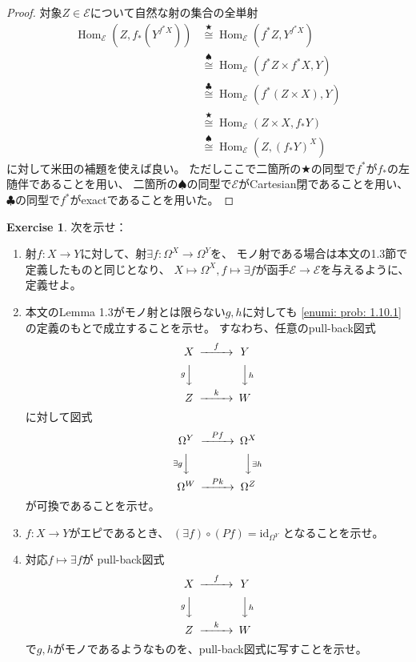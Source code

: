 \documentclass[uplatex]{jsarticle}
\theoremstyle{definition}
\newtheorem{prob}[prob]{Exercise}
\def\id{\mathrm{id}}
\DeclareMathOperator{\Hom}{Hom}
\def\mcE{\mathcal{E}}
\begin{document}
\begin{proof}
  対象\(Z\in \mcE\)について自然な射の集合の全単射
  \begin{align*}
    \Hom_{\mcE}(Z,f_*(Y^{f^*X}))
    &\overset{\bigstar}{\cong}
    \Hom_{\mcE}(f^*Z,Y^{f^*X}) \\
    &\overset{\spadesuit}{\cong}
    \Hom_{\mcE}(f^*Z\times f^*X,Y) \\
    &\overset{\clubsuit}{\cong}
    \Hom_{\mcE}(f^*(Z\times X),Y) \\
    &\overset{\bigstar}{\cong}
    \Hom_{\mcE}(Z\times X,f_*Y) \\
    &\overset{\spadesuit}{\cong}
    \Hom_{\mcE}(Z,(f_*Y)^X)
  \end{align*}
  に対して米田の補題を使えば良い。
  ただしここで二箇所の\(\bigstar\)の同型で\(f^*\)が\(f_*\)の左随伴であることを用い、
  二箇所の\(\spadesuit\)の同型で\(\mcE\)がCartesian閉であることを用い、
  \(\clubsuit\)の同型で\(f^*\)がexactであることを用いた。
\end{proof}


\begin{prob}\label{prob: 1.10}
  次を示せ：
  \begin{enumerate}
    \item \label{enumi: prob: 1.10.1}
    射\(f:X\to Y\)に対して、射\(\exists f:\Omega^X \to \Omega^Y\)を、
    モノ射である場合は本文の1.3節で定義したものと同じとなり、
    \(X\mapsto \Omega^X,f\mapsto \exists f\)が函手\(\mcE\to \mcE\)を与えるように、
    定義せよ。
    \item \label{enumi: prob: 1.10.2}
    本文のLemma 1.3がモノ射とは限らない\(g,h\)に対しても
    \ref{enumi: prob: 1.10.1}の定義のもとで成立することを示せ。
    すなわち、任意のpull-back図式
    \[
    \begin{CD}
      X @> f >> Y \\
      @V g VV @VV h V \\
      Z @> k >> W
    \end{CD}
    \]
    に対して図式
    \[
    \begin{CD}
      \Omega^Y @> Pf >> \Omega^X \\
      @V \exists g VV  @VV \exists h V \\
      \Omega^W @> Pk >> \Omega^Z
    \end{CD}
    \]
    が可換であることを示せ。
    \item \label{enumi: prob: 1.10.3}
    \(f:X\to Y\)がエピであるとき、
    \((\exists f) \circ (Pf) = \id_{\Omega^Y}\)
    となることを示せ。
    \item \label{enumi: prob: 1.10.4}
    対応\(f\mapsto \exists f\)が
    pull-back図式
    \[
    \begin{CD}
      X @> f >> Y \\
      @V g VV @VV h V \\
      Z @> k >> W
    \end{CD}
    \]
    で\(g,h\)がモノであるようなものを、pull-back図式に写すことを示せ。
  \end{enumerate}
\end{prob}
\end{document}
